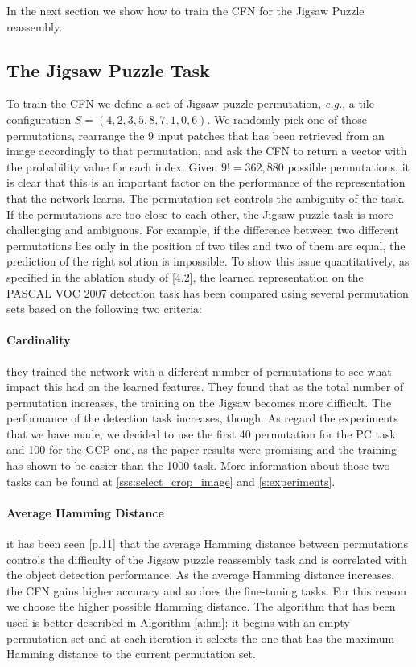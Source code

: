 In the next section we show how to train the CFN for the Jigsaw Puzzle reassembly.



\subsection{The Jigsaw Puzzle Task}
To train the CFN we define a set of Jigsaw puzzle permutation, \textit{e.g.}, a tile configuration \(S=(4, 2, 3, 5, 8, 7, 1, 0, 6)\). We randomly pick one of those permutations, rearrange the 9 input patches that has been retrieved from an image accordingly to that permutation, and ask the CFN to return a vector with the probability value for each index. Given \(9!=362,880\) possible permutations, it is clear that this is an important factor on the performance of the representation that the network learns. \newline
The permutation set controls the ambiguity of the task. If the permutations are too close to each other, the Jigsaw puzzle task is more challenging and ambiguous. For example, if the difference between two different permutations lies only in the position of two tiles and two of them are equal, the prediction of the right solution is impossible. To show this issue quantitatively, as specified in the ablation study of \cite{Noroozi_2016}[4.2], the learned representation on the PASCAL VOC 2007 detection task has been compared using several permutation sets based on the following two criteria:
\paragraph{Cardinality}
they trained the network with a different number of permutations to see what impact this had on the learned features. They found that as the total number of permutation increases, the training on the Jigsaw becomes more difficult. The performance of the detection task increases, though. As regard the experiments that we have made, we decided to use the first 40 permutation for the PC task and 100 for the GCP one, as the paper results were promising and the training has shown to be easier than the 1000 task. More information about those two tasks can be found at \ref{sss:select_crop_image} and \ref{s:experiments}.
\paragraph{Average Hamming Distance}
it has been seen \cite{Noroozi_2016}[p.11] that the average Hamming distance between permutations controls the difficulty of the Jigsaw puzzle reassembly task and is correlated with the object detection performance. As the average Hamming distance increases, the CFN gains higher accuracy and so does the fine-tuning tasks. For this reason we choose the higher possible Hamming distance. The algorithm that has been used is better described in Algorithm \ref{a:hm}: it begins with an empty permutation set and at each iteration it selects the one that has the maximum Hamming distance to the current permutation set.

